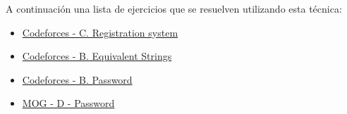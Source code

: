 A continuación una lista de ejercicios que se resuelven utilizando esta técnica:

\begin{itemize}
	\item \href{https://codeforces.com/problemset/problem/4/C} {Codeforces - C. Registration system} 
	\item \href{https://codeforces.com/problemset/problem/559/B }{Codeforces - B. Equivalent Strings}
	\item \href{https://codeforces.com/problemset/problem/126/B}{Codeforces - B. Password}
	\item \href{https://matcomgrader.com/problem/94/password/}{MOG - D - Password}
\end{itemize}